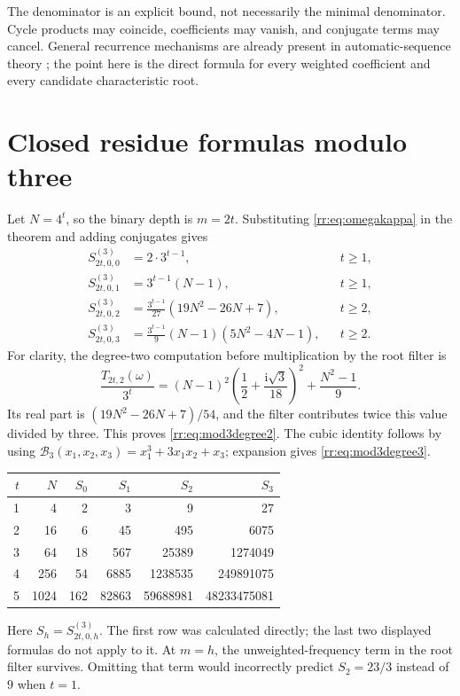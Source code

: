 \documentclass[11pt,a4paper,oneside,openany]{book}
\numberwithin{equation}{chapter}
\theoremstyle{definition}
\theoremstyle{remark}
\newcommand{\ii}{\mathrm i}
\newcommand{\B}{\mathcal B}
\begin{document}
The denominator is an explicit bound, not necessarily the minimal denominator. Cycle products may coincide, coefficients may vanish, and conjugate terms may cancel. General recurrence mechanisms are already present in automatic-sequence theory \cite{sobolewski}; the point here is the direct formula for every weighted coefficient and every candidate characteristic root.

\section{Closed residue formulas modulo three}
Let \(N=4^t\), so the binary depth is \(m=2t\). Substituting \eqref{rr:eq:omegakappa} in the theorem and adding conjugates gives
\begin{align}
 S^{(3)}_{2t,0,0}&=2\cdot3^{t-1},&&t\geq1,\\
 S^{(3)}_{2t,0,1}&=3^{t-1}(N-1),&&t\geq1,\\
 S^{(3)}_{2t,0,2}&=\frac{3^{t-1}}{27}(19N^2-26N+7),&&t\geq2,\label{rr:eq:mod3degree2}\\
 S^{(3)}_{2t,0,3}&=\frac{3^{t-1}}9(N-1)(5N^2-4N-1),&&t\geq2.
 \label{rr:eq:mod3degree3}
\end{align}
For clarity, the degree-two computation before multiplication by the root filter is
\[
 \frac{T_{2t,2}(\omega)}{3^t}
 =(N-1)^2\left(\frac12+\frac{\ii\sqrt3}{18}\right)^2
          +\frac{N^2-1}{9}.
\]
Its real part is \((19N^2-26N+7)/54\), and the filter contributes twice this value divided by three. This proves \eqref{rr:eq:mod3degree2}. The cubic identity follows by using \(\B_3(x_1,x_2,x_3)=x_1^3+3x_1x_2+x_3\); expansion gives \eqref{rr:eq:mod3degree3}.

\begin{center}
\begin{tabular}{rrrrrr}
\toprule
\(t\)&\(N\)&\(S_0\)&\(S_1\)&\(S_2\)&\(S_3\)\\
\midrule
1&4&2&3&9&27\\
2&16&6&45&495&6075\\
3&64&18&567&25389&1274049\\
4&256&54&6885&1238535&249891075\\
5&1024&162&82863&59688981&48233475081\\
\bottomrule
\end{tabular}
\end{center}
Here \(S_h=S^{(3)}_{2t,0,h}\). The first row was calculated directly; the last two displayed formulas do not apply to it. At \(m=h\), the unweighted-frequency term in the root filter survives. Omitting that term would incorrectly predict \(S_2=23/3\) instead of \(9\) when \(t=1\).
\end{document}
